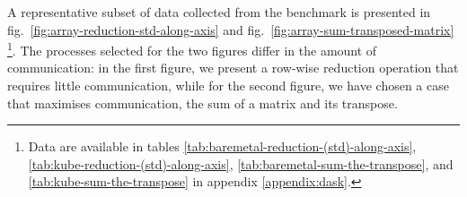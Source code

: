 

A representative subset of data collected from the benchmark is presented in
fig.~\ref{fig:array-reduction-std-along-axis} and
fig.~\ref{fig:array-sum-transposed-matrix} \footnote{Data are available in
tables
\ref{tab:baremetal-reduction-(std)-along-axis},\ref{tab:kube-reduction-(std)-along-axis},
\ref{tab:baremetal-sum-the-transpose}, and \ref{tab:kube-sum-the-transpose} in
appendix \ref{appendix:dask}.}. The processes selected for the two figures
differ in the amount of communication: in the first figure, we present a
row-wise reduction operation that requires little communication, while for the
second figure, we have chosen a case that maximises communication, the sum of a
matrix and its transpose.


